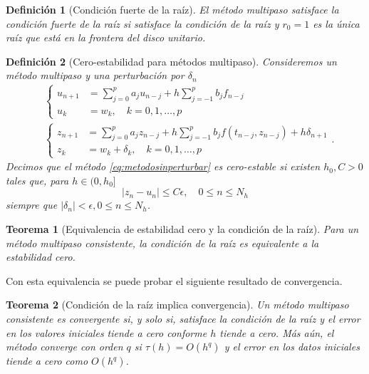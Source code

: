\documentclass[11pt,letterpaper]{article}
\newtheorem{definition}{Definición}
\newtheorem{theorem}{Teorema}
\begin{document}
\begin{definition}[Condición fuerte de la raíz]
  El método multipaso satisface la \emph{condición fuerte de la raíz}
  si satisface la condición de la raíz y $r_0=1$ es la única raíz que
  está en la frontera del disco unitario.
\end{definition}

\begin{definition}[Cero-estabilidad para métodos multipaso]
  Consideremos un método multipaso y una perturbación por
  $\delta_{n}$
  \begin{align}
    &\left\{
      \begin{aligned}
        u_{n+1}
        &= \sum_{j=0}^{p}a_ju_{n-j}
        + h \sum_{j=-1}^{p} b_jf_{n-j} \\
        u_k &= w_k, \quad k=0,1,\dots,p
      \end{aligned}
    \right.
    \label{eq:metodosinperturbar}
    \\
    &\left\{
      \begin{aligned}
        z_{n+1}
        &= \sum_{j=0}^{p}a_jz_{n-j}
        + h \sum_{j=-1}^{p} b_jf(t_{n-j},z_{n-j}) + h\delta_{n+1} \\
        z_k &= w_k + \delta_k, \quad k=0,1,\dots,p
      \end{aligned}
    \right.
  .\end{align}
  Decimos que el método \eqref{eq:metodosinperturbar}  
  es cero-estable si existen $h_0,C>0$ tales
  que, para $h\in(0,h_0]$
  \begin{equation}
    |z_n-u_n|\leq C\epsilon, \quad 0\leq n\leq N_h
  \end{equation}
  siempre que $|\delta_n|<\epsilon, 0\leq n\leq N_h$.
\end{definition}

\begin{theorem}[Equivalencia de estabilidad cero y la condición de la
  raíz]\label{thm:estabilidad_y_raiz}
  Para un método multipaso consistente, la condición de la raíz es
  equivalente a la estabilidad cero.
\end{theorem}

Con esta equivalencia se puede probar el siguiente resultado de
convergencia.

\begin{theorem}[Condición de la raíz implica convergencia]
  \label{thm:raiz_y_convergencia}
  Un método multipaso consistente es convergente si, y solo si,
  satisface la condición de la raíz y el error en los valores
  iniciales tiende a cero conforme $h$ tiende a cero. Más aún, el
  método converge con orden $q$ si $\tau(h)=O(h^q)$ y el error en los
  datos iniciales tiende a cero como $O(h^q)$.
\end{theorem}
\end{document}
